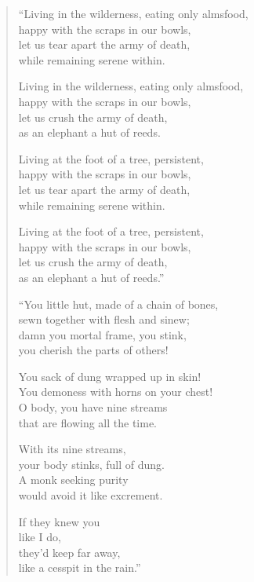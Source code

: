 \documentclass[12pt,openany]{book}%
\begin{document}
\begin{verse}%
“Living in the wilderness, eating only almsfood, \\
happy with the scraps in our bowls, \\
let us tear apart the army of death, \\
while remaining serene within. 

Living in the wilderness, eating only almsfood, \\
happy with the scraps in our bowls, \\
let us crush the army of death, \\
as an elephant a hut of reeds. 

Living at the foot of a tree, persistent, \\
happy with the scraps in our bowls, \\
let us tear apart the army of death, \\
while remaining serene within. 

Living at the foot of a tree, persistent, \\
happy with the scraps in our bowls, \\
let us crush the army of death, \\
as an elephant a hut of reeds.” 

“You little hut, made of a chain of bones, \\
sewn together with flesh and sinew; \\
damn you mortal frame, you stink, \\
you cherish the parts of others! 

You sack of dung wrapped up in skin! \\
You demoness with horns on your chest! \\
O body, you have nine streams \\
that are flowing all the time. 

With its nine streams, \\
your body stinks, full of dung. \\
A monk seeking purity \\
would avoid it like excrement. 

If they knew you \\
like I do, \\
they’d keep far away, \\
like a cesspit in the rain.” 


\end{verse}
\end{document}
